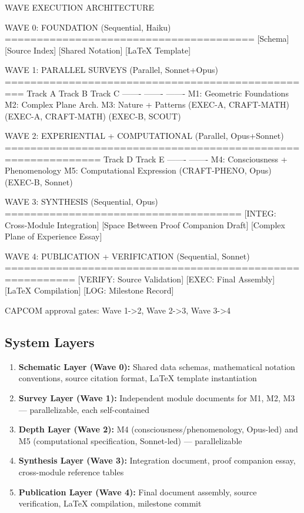 \documentclass[11pt,letterpaper]{article}
\begin{document}
\begin{asciibox}
WAVE EXECUTION ARCHITECTURE

  WAVE 0: FOUNDATION (Sequential, Haiku)
  =======================================
  [Schema]  [Source Index]  [Shared Notation]  [LaTeX Template]

  WAVE 1: PARALLEL SURVEYS (Parallel, Sonnet+Opus)
  =================================================
  Track A                     Track B                   Track C
  -------                     -------                   -------
  M1: Geometric Foundations   M2: Complex Plane Arch.   M3: Nature + Patterns
  (EXEC-A, CRAFT-MATH)        (EXEC-A, CRAFT-MATH)      (EXEC-B, SCOUT)

  WAVE 2: EXPERIENTIAL + COMPUTATIONAL (Parallel, Opus+Sonnet)
  =============================================================
  Track D                               Track E
  -------                               -------
  M4: Consciousness + Phenomenology     M5: Computational Expression
  (CRAFT-PHENO, Opus)                   (EXEC-B, Sonnet)

  WAVE 3: SYNTHESIS (Sequential, Opus)
  =====================================
  [INTEG: Cross-Module Integration]
  [Space Between Proof Companion Draft]
  [Complex Plane of Experience Essay]

  WAVE 4: PUBLICATION + VERIFICATION (Sequential, Sonnet)
  =========================================================
  [VERIFY: Source Validation]  [EXEC: Final Assembly]
  [LaTeX Compilation]          [LOG: Milestone Record]

  CAPCOM approval gates: Wave 1->2, Wave 2->3, Wave 3->4
\end{asciibox}

\subsection{System Layers}

\begin{enumerate}
  \item \textbf{Schematic Layer (Wave 0):} Shared data schemas, mathematical notation conventions, source citation format, LaTeX template instantiation
  \item \textbf{Survey Layer (Wave 1):} Independent module documents for M1, M2, M3 --- parallelizable, each self-contained
  \item \textbf{Depth Layer (Wave 2):} M4 (consciousness/phenomenology, Opus-led) and M5 (computational specification, Sonnet-led) --- parallelizable
  \item \textbf{Synthesis Layer (Wave 3):} Integration document, proof companion essay, cross-module reference tables
  \item \textbf{Publication Layer (Wave 4):} Final document assembly, source verification, LaTeX compilation, milestone commit
\end{enumerate}
\end{document}
